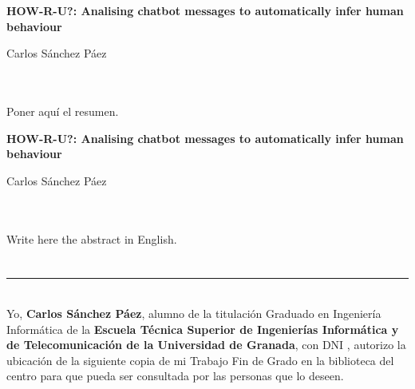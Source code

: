 
\cleardoublepage
\thispagestyle{empty}

\begin{center}
{\large\bfseries HOW-R-U?: Analising chatbot messages to automatically infer human behaviour}\\
\end{center}
\begin{center}
Carlos Sánchez Páez\\
\end{center}

\\

\vspace{0.7cm}
\\

Poner aquí el resumen.
\cleardoublepage


\thispagestyle{empty}


\begin{center}
{\large\bfseries HOW-R-U?: Analising chatbot messages to automatically infer human behaviour}\\
\end{center}
\begin{center}
Carlos Sánchez Páez\\
\end{center}

\\

\vspace{0.7cm}
\\

Write here the abstract in English.

\newpage

\section*{}
\thispagestyle{empty}

\noindent\rule[-1ex]{\textwidth}{2pt}\\[4.5ex]

Yo, \textbf{Carlos Sánchez Páez}, alumno de la titulación Graduado en Ingeniería Informática de la \textbf{Escuela Técnica Superior
de Ingenierías Informática y de Telecomunicación de la Universidad de Granada}, con DNI , autorizo la
ubicación de la siguiente copia de mi Trabajo Fin de Grado en la biblioteca del centro para que pueda ser
consultada por las personas que lo deseen.


